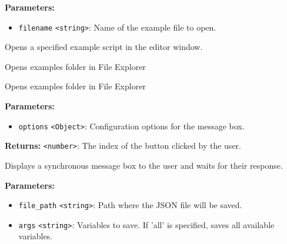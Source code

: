 \documentclass[12pt,a4paper]{article}
\begin{document}
\noindent \textbf{Parameters:}
\begin{itemize}
  \item \texttt{filename} \texttt{<string>}: Name of the example file to open.
\end{itemize}

\noindent Opens a specified example script in the editor window.

\vspace{5mm}
\noindent {}


\noindent Opens examples folder in File Explorer

\vspace{5mm}
\noindent {}


\noindent Opens examples folder in File Explorer

\vspace{5mm}
\noindent {}


\noindent \textbf{Parameters:}
\begin{itemize}
  \item \texttt{options} \texttt{<Object>}: Configuration options for the message box.
\end{itemize}

\noindent \textbf{Returns:} \texttt{<number>}: The index of the button clicked by the user.

\noindent Displays a synchronous message box to the user and waits for their response.

\vspace{5mm}
\noindent {}


\noindent \textbf{Parameters:}
\begin{itemize}
  \item \texttt{file\_path} \texttt{<string>}: Path where the JSON file will be saved.
  \item \texttt{args} \texttt{<string>}: Variables to save. If 'all' is specified, saves all available variables.
\end{itemize}
\end{document}
